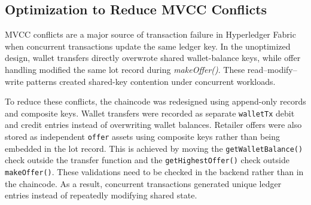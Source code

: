 \documentclass[manuscript,screen]{acmart}
\begin{document}
\begin{table}[h]
	\centering
	\caption{Runtime Resource Utilization of Smart Contract and Retrieval Functions at 500 TPS Load}
	\label{tab:resource-combined}
\end{table}
	
\subsection{Optimization to Reduce MVCC Conflicts}

MVCC conflicts are a major source of transaction failure in Hyperledger Fabric when concurrent transactions update the same ledger key. In the unoptimized design, wallet transfers directly overwrote shared wallet-balance keys, while offer handling modified the same lot record during \textit{makeOffer()}. These read--modify--write patterns created shared-key contention under concurrent workloads.

To reduce these conflicts, the chaincode was redesigned using append-only records and composite keys. Wallet transfers were recorded as separate \texttt{walletTx} debit and credit entries instead of overwriting wallet balances. Retailer offers were also stored as independent \texttt{offer} assets using composite keys rather than being embedded in the lot record. This is achieved by moving the \texttt{getWalletBalance()} check outside the transfer function and the \texttt{getHighestOffer()} check outside \texttt{makeOffer()}. These validations need to be checked in the backend rather than in the chaincode. As a result, concurrent transactions generated unique ledger entries instead of repeatedly modifying shared state.
\end{document}

